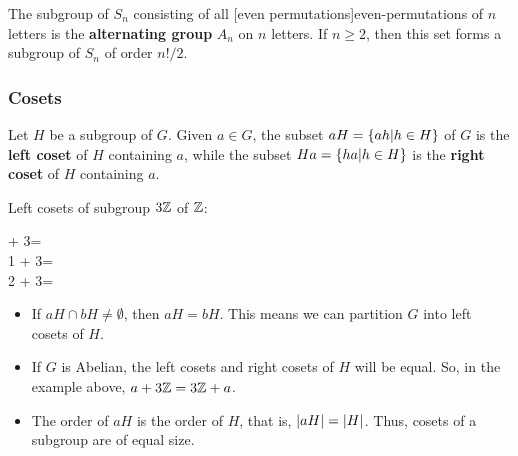\documentclass{article}
\begin{document}
\begin{definition}
The \@{subgroup} of $S_n$ consisting of all \@[even permutations]{even-permutations} of $n$ letters is the \textbf{alternating group} $A_n$ on $n$ letters. If $n \geq 2$, then this set forms a subgroup of $S_n$ of \@{order} $n!/2$.
\end{definition}

\subsubsection{Cosets}

\begin{definition}[coset]
Let $H$ be a \@{subgroup} of $G$. Given $a \in G$, the \@{subset} $aH = \left\{ ah | h \in H \right\}$ of $G$ is the \textbf{left coset} of $H$ containing $a$, while the subset $Ha = \left\{ ha | h \in H \right\}$ is the \textbf{right coset} of $H$ containing $a$.
\end{definition}

\begin{example}
Left \@{cosets} of \@{subgroup} $3\mathbb{Z}$ of $\mathbb{Z}$:

 + 3\integers =  \\ 1 + 3\integers =  \\  2 + 3\integers =  \\  \eal
\end{example}

\begin{proposition}\label{coset-properties}
\begin{itemize}
\item If $aH \cap bH \neq \emptyset $, then $aH = bH$. This means we can partition $G$ into left \@{cosets} of $H$.
\end{itemize}

\begin{itemize}
\item If $G$ is \@{Abelian}, the left cosets and right cosets of $H$ will be equal. So, in the example above, $a + 3\mathbb{Z} = 3\mathbb{Z} + a$.
\end{itemize}

\begin{itemize}
\item The \@{order} of $aH$ is the order of $H$, that is, $\left| aH \right| = \left| H \right|$. Thus, cosets of a \@{subgroup} are of equal size.
\end{itemize}
\end{proposition}
\end{document}
